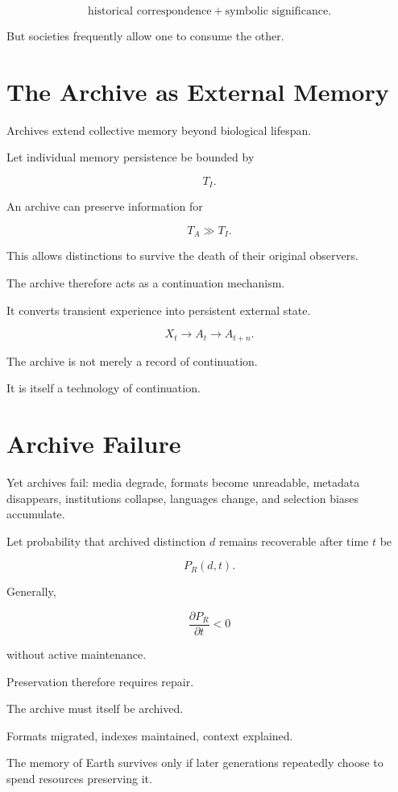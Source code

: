 \documentclass[11pt,oneside]{book}
\theoremstyle{definition}
\theoremstyle{remark}
\begin{document}
\[
\text{historical correspondence}
+
\text{symbolic significance}.
\]

But societies frequently allow one to consume the other.

\section{The Archive as External Memory}

Archives extend collective memory beyond biological lifespan.

Let individual memory persistence be bounded by

\[
T_I.
\]

An archive can preserve information for

\[
T_A\gg T_I.
\]

This allows distinctions to survive the death of their original observers.

The archive therefore acts as a continuation mechanism.

It converts transient experience into persistent external state.

\[
X_t
\rightarrow
A_t
\rightarrow
A_{t+n}.
\]

The archive is not merely a record of continuation.

It is itself a technology of continuation.

\section{Archive Failure}

Yet archives fail: media degrade, formats become unreadable, metadata disappears, institutions collapse, languages change, and selection biases accumulate.

Let probability that archived distinction \(d\) remains recoverable after time \(t\) be

\[
P_R(d,t).
\]

Generally,

\[
\frac{\partial P_R}{\partial t}<0
\]

without active maintenance.

Preservation therefore requires repair.

The archive must itself be archived.

Formats migrated, indexes maintained, context explained.

The memory of Earth survives only if later generations repeatedly choose to spend resources preserving it.
\end{document}
